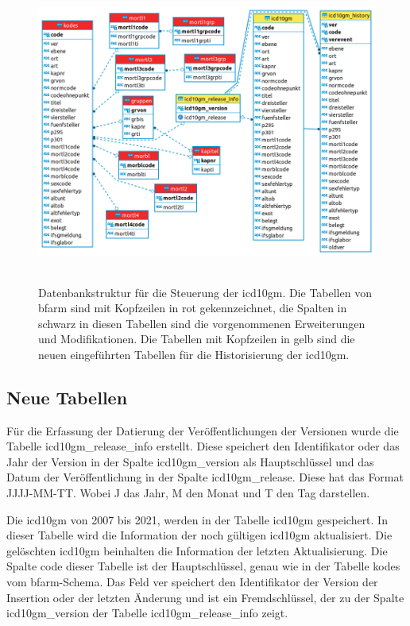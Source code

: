 \clearpage	

\begin{figure}[ht]
	\centering
	\includegraphics[height=10cm]{figures/icdSqlSchema}
	\caption[Datenbankstruktur]{Datenbankstruktur für die Steuerung der \ac{icd10gm}. Die Tabellen von \ac{bfarm} sind mit Kopfzeilen in rot gekennzeichnet, die Spalten in schwarz in diesen Tabellen sind die vorgenommenen Erweiterungen und Modifikationen. Die Tabellen mit Kopfzeilen in gelb sind die neuen eingeführten Tabellen für die Historisierung der \ac{icd10gm}.}
	\label{fig:reldb2}
\end{figure}

\subsection{Neue Tabellen} \label{subsec:newtables}

Für die Erfassung der Datierung der Veröffentlichungen der Versionen wurde die Tabelle \glqq\textsf{icd10gm\_release\_info}\grqq{} erstellt. Diese speichert den Identifikator oder das Jahr der Version in der Spalte \glqq\textsf{icd10gm\_version}\grqq{} als Hauptschlüssel und das Datum der Veröffentlichung in der Spalte \glqq\textsf{icd10gm\_release}\grqq{}. Diese hat das Format \glqq\textsf{JJJJ-MM-TT}\grqq{}. Wobei \glqq J\grqq{} das Jahr, \glqq M\grqq{} den Monat und \glqq T\grqq{} den Tag darstellen.

Die \ac{icd10gm} von 2007 bis 2021, werden in der Tabelle \glqq\textsf{icd10gm}\grqq{} gespeichert. In dieser Tabelle wird die Information der noch gültigen \ac{icd10gm} aktualisiert. Die gelöschten \ac{icd10gm} beinhalten die Information der letzten Aktualisierung. Die Spalte \textsf{code}\grqq{} dieser Tabelle ist der Hauptschlüssel, genau wie in der Tabelle \glqq\textsf{kodes}\grqq{} vom \ac{bfarm}-Schema. Das Feld \glqq\textsf{ver}\grqq{} speichert den Identifikator der Version der Insertion oder der letzten Änderung und ist ein Fremdschlüssel, der zu der Spalte \glqq\textsf{icd10gm\_version}\grqq{} der Tabelle \glqq\textsf{icd10gm\_release\_info}\grqq{} zeigt.

